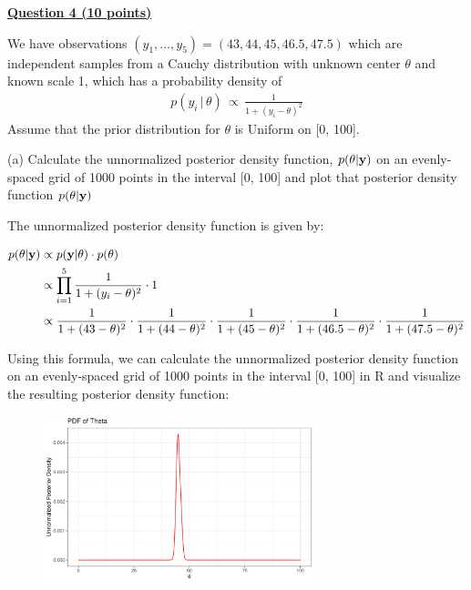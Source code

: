 \documentclass[12pt]{article}
\def\by{{\rm {\bf{y}}}}
\begin{document}
\bigskip

{\underline{\bf Question 4 (10 points)}}  

We have observations $(y_1,\ldots,y_5) = (43, 44, 45, 46.5, 47.5)$ which are independent samples from a Cauchy distribution with unknown center $\theta$ and known scale 1, which has a probability density of 
\begin{eqnarray*}
p(y_i \, | \, \theta) \, \propto \, \frac{1}{1 + (y_i - \theta)^2} 
\end{eqnarray*}
Assume that the prior distribution for $\theta$ is Uniform on [0, 100].  

(a) Calculate the unnormalized posterior density function, $p(\theta | \by)$ on an evenly-spaced grid of 1000 points in the interval [0, 100] and plot that posterior density function $p(\theta | \by)$

The unnormalized posterior density function is given by:

\begin{align*}
p(\theta | \by) &\propto p(\by | \theta) \cdot p(\theta) \\
&\propto \prod_{i=1}^5 \frac{1}{1 + (y_i - \theta)^2} \cdot 1 \\
&\propto \frac{1}{1 + (43 - \theta)^2} \cdot \frac{1}{1 + (44 - \theta)^2} \cdot \frac{1}{1 + (45 - \theta)^2} \cdot \frac{1}{1 + (46.5 - \theta)^2} \cdot \frac{1}{1 + (47.5 - \theta)^2} \\
\end{align*}

Using this formula, we can calculate the unnormalized posterior density function on an evenly-spaced grid of 1000 points in
the interval [0, 100] in R and visualize the resulting posterior density function:

\begin{figure}[h]
    \centering
    \includegraphics[width=0.7\textwidth]{q4a_plot.pdf}
\end{figure}
\end{document}
